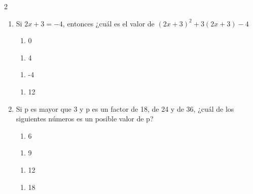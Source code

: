 \documentclass[10.5pt,letterpaper]{article}
\begin{document}
\begin{multicols}{2}
\begin{enumerate}
\item Si $2x+3=-4$, entonces ¿cuál es el valor de $(2x+3)^2+3(2x+3)-4$\\
\begin{minipage}{0.23\linewidth}
\begin{enumerate}
\item[a)] 0
\end{enumerate}
\end{minipage}
\begin{minipage}{0.23\linewidth}
\begin{enumerate}
\item[b)] 4
\end{enumerate}
\end{minipage}
\begin{minipage}{0.23\linewidth}
\begin{enumerate}
\item[c)] -4
\end{enumerate}
\end{minipage}
\begin{minipage}{0.23\linewidth}
\begin{enumerate}
\item[d)] 12
\end{enumerate}
\end{minipage}
\item Si p es mayor que 3 y p es un factor de 18, de 24 y de 36, ¿cuál de los siguientes números es un posible valor de p?\\
\begin{minipage}{0.23\linewidth}
\begin{enumerate}
\item[a)] 6
\end{enumerate}
\end{minipage}
\begin{minipage}{0.23\linewidth}
\begin{enumerate}
\item[b)] 9
\end{enumerate}
\end{minipage}
\begin{minipage}{0.23\linewidth}
\begin{enumerate}
\item[c)] 12
\end{enumerate}
\end{minipage}
\begin{minipage}{0.23\linewidth}
\begin{enumerate}
\item[d)] 18

\end{enumerate}
\end{minipage}
\end{enumerate}
\end{multicols}
\end{document}
